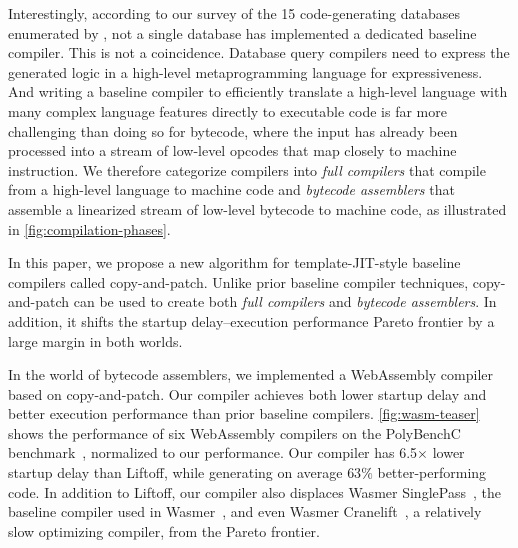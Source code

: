 \documentclass[acmsmall,nonacm,screen]{acmart}\settopmatter{printfolios=true,printccs=true,printacmref=false}
\newcommand{\figref}[1]{\autoref{#1}}
\newcommand{\cp}{copy-and-patch}
\newcommand{\X}{$\times$}
\begin{document}
Interestingly, according to our survey of the 15 code-generating databases enumerated by  \citet{databaseOfDatabases}, not a single database has implemented a dedicated baseline compiler. This is not a coincidence. Database query compilers need to express the generated logic in a high-level metaprogramming language for expressiveness. And writing a baseline compiler to efficiently translate a high-level language with many complex language features directly to executable code is far more challenging than doing so for bytecode, where the input has already been processed into a stream of low-level opcodes that map closely to machine instruction. We therefore categorize compilers into \textit{full compilers} that compile from a high-level language to machine code and \textit{bytecode assemblers} that assemble a linearized stream of low-level bytecode to machine code, as illustrated in \figref{fig:compilation-phases}.

In this paper, we propose a new algorithm for template-JIT-style baseline compilers called \cp{}. Unlike prior baseline compiler techniques, \cp{} can be used to create both \textit{full compilers} and \textit{bytecode assemblers}. In addition, it shifts the startup delay--execution performance Pareto frontier by a large margin in both worlds. 

In the world of bytecode assemblers, we implemented a WebAssembly compiler based on \cp{}. Our compiler achieves both lower startup delay and better execution performance than prior baseline compilers. \figref{fig:wasm-teaser} shows the performance of six WebAssembly compilers on the PolyBenchC benchmark~\cite{polybenchc}, normalized to our performance. Our compiler has \num{6.5}\X{} lower startup delay than Liftoff, while generating on average $63\%$ better-performing code. In addition to Liftoff, our compiler also displaces Wasmer SinglePass~\cite{wasmerSinglepassJit}, the baseline compiler used in Wasmer~\cite{wasmer}, and even Wasmer Cranelift~\cite{wasmerCraneliftJit}, a relatively slow optimizing compiler, from the Pareto frontier.
\end{document}
